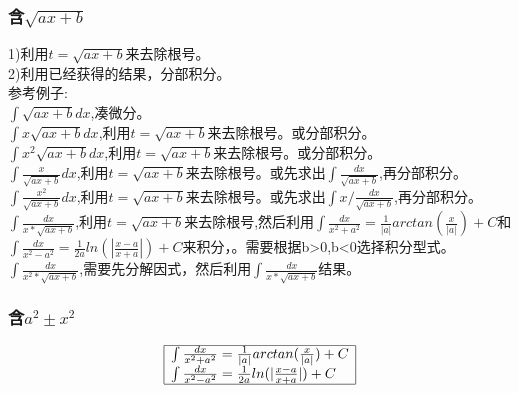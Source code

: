 \documentclass[fleqn]{article}
\begin{document}
\begin{flushleft}
		\subsubsection{含$\sqrt{ax+b}$}
		1)利用$t=\sqrt{ax+b}$来去除根号。\\
		2)利用已经获得的结果，分部积分。\\
		参考例子:\\
			$\int \sqrt{ax+b}dx$,凑微分。\\ 
			$\int x\sqrt{ax+b}dx$,利用$t=\sqrt{ax+b}$来去除根号。或分部积分。\\ 
			$\int x^2\sqrt{ax+b}dx$,利用$t=\sqrt{ax+b}$来去除根号。或分部积分。\\ 
			$\int \frac{x}{\sqrt{ax+b}}dx$,利用$t=\sqrt{ax+b}$来去除根号。或先求出$\int \frac{dx}{\sqrt{ax+b}}$,再分部积分。\\ 
			$\int \frac{x^2}{\sqrt{ax+b}}dx$,利用$t=\sqrt{ax+b}$来去除根号。或先求出$\int x/\frac{dx}{\sqrt{ax+b}}$,再分部积分。\\ 
			$\int \frac{dx}{x*\sqrt{ax+b}}$,利用$t=\sqrt{ax+b}$来去除根号,然后利用$\int\frac{dx}{x^2+a^2}=\frac{1}{|a|}arctan(\frac{x}{|a|})+C $和$\int\frac{dx}{x^2-a^2}=\frac{1}{2a}ln(|\frac{x-a}{x+a}|)+C$来积分，。需要根据b>0,b<0选择积分型式。\\ 
			$\int \frac{dx}{x^2*\sqrt{ax+b}}$,需要先分解因式，然后利用$\int \frac{dx}{x*\sqrt{ax+b}}$结果。\\

		\subsubsection{含$a^2 \pm x^2$}	
		\[
		\begin{array}{|l|}
			\hline
			\int\frac{dx}{x^2+a^2}=\frac{1}{|a|}arctan(\frac{x}{|a|})+C\\
			\int\frac{dx}{x^2-a^2}=\frac{1}{2a}ln(|\frac{x-a}{x+a}|)+C \\
			\hline
		\end{array}
		\]

\end{flushleft}
\end{document}

